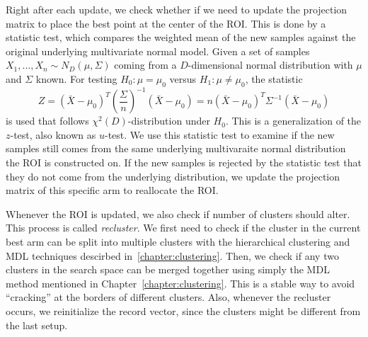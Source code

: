 Right after each update, we check whether if we need to update the projection matrix to place the best point at the center of the ROI.
This is done by a statistic test, which compares the weighted mean of the new samples against the original underlying multivariate normal model.
Given a set of samples $X_1, ..., X_n \sim N_{D}(\mu, \Sigma)$ coming from a $D$-dimensional normal distribution with $\mu$ and $\Sigma$ known. 
For testing $H_0: \mu = \mu_0$ versus $H_1: \mu \neq \mu_0$, the statistic
\begin{displaymath}
Z = ( \bar{X} - \mu_0 )^T (\frac{\Sigma}{n})^{-1} ( \bar{X} - \mu_0 ) = n( \bar{X} - \mu_0 )^T \Sigma^{-1} ( \bar{X} - \mu_0 )
\end{displaymath}
is used that follows $ \chi^{2}(D)$-distribution under $H_0$.
This is a generalization of the $z$-test, also known as $u$-test.
We use this statistic test to examine if the new samples still comes from the same underlying multivaraite normal distribution the ROI is constructed on.
If the new samples is rejected by the statistic test that they do not come from the underlying distribution, 
we update the projection matrix of this specific arm to reallocate the ROI.

Whenever the ROI is updated, we also check if number of clusters should alter.
This process is called \textit{recluster}.
We first need to check if the cluster in the current best arm can be split into multiple clusters 
with the hierarchical clustering and MDL techniques descirbed in~\ref{chapter:clustering}.  
Then, we check if any two clusters in the search space can be merged together 
using simply the MDL method mentioned in Chapter~\ref{chapter:clustering}.  
This is a stable way to avoid ``cracking'' at the borders of different clusters.
Also, whenever the recluster occurs, we reinitialize the record vector, since the clusters might be different from the last setup.



